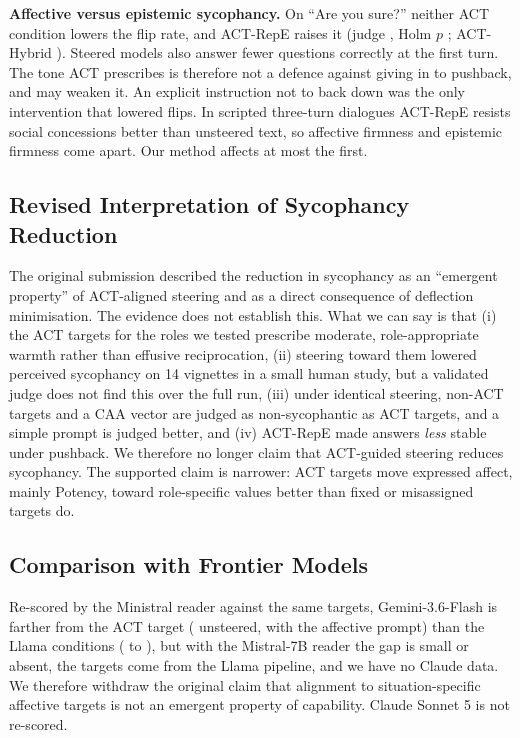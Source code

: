 \documentclass[letterpaper]{article} %
\begin{document}
\textbf{Affective versus epistemic sycophancy.} On ``Are you sure?'' neither ACT condition lowers the flip rate, and ACT-RepE raises it (judge \AysJdRepeactDelta, Holm $p$ \AysJdRepeactP; ACT-Hybrid \AysJdHybridactDelta). Steered models also answer fewer questions correctly at the first turn. The tone ACT prescribes is therefore not a defence against giving in to pushback, and may weaken it. An explicit instruction not to back down was the only intervention that lowered flips. In scripted three-turn dialogues ACT-RepE resists social concessions better than unsteered text, so affective firmness and epistemic firmness come apart. Our method affects at most the first.

\subsection{Revised Interpretation of Sycophancy Reduction}

The original submission described the reduction in sycophancy as an ``emergent property'' of ACT-aligned steering and as a direct consequence of deflection minimisation. The evidence does not establish this. What we can say is that (i) the ACT targets for the roles we tested prescribe moderate, role-appropriate warmth rather than effusive reciprocation, (ii) steering toward them lowered perceived sycophancy on 14 vignettes in a small human study, but a validated judge does not find this over the full run, (iii) under identical steering, non-ACT targets and a CAA vector are judged as non-sycophantic as ACT targets, and a simple prompt is judged better, and (iv) ACT-RepE made answers \emph{less} stable under pushback. We therefore no longer claim that ACT-guided steering reduces sycophancy. The supported claim is narrower: ACT targets move expressed affect, mainly Potency, toward role-specific values better than fixed or misassigned targets do.

\subsection{Comparison with Frontier Models}

Re-scored by the Ministral reader against the same targets, Gemini-3.6-Flash is farther from the ACT target (\FrontierGeminiGeminiunsteered{} unsteered, \FrontierGeminiGeminipe{} with the affective prompt) than the Llama conditions (\FrontierLlamaThreeHybrid{} to \FrontierLlamaThreePeonly), but with the Mistral-7B reader the gap is small or absent, the targets come from the Llama pipeline, and we have no Claude data. We therefore withdraw the original claim that alignment to situation-specific affective targets is not an emergent property of capability. Claude Sonnet 5 is not re-scored.
\end{document}
